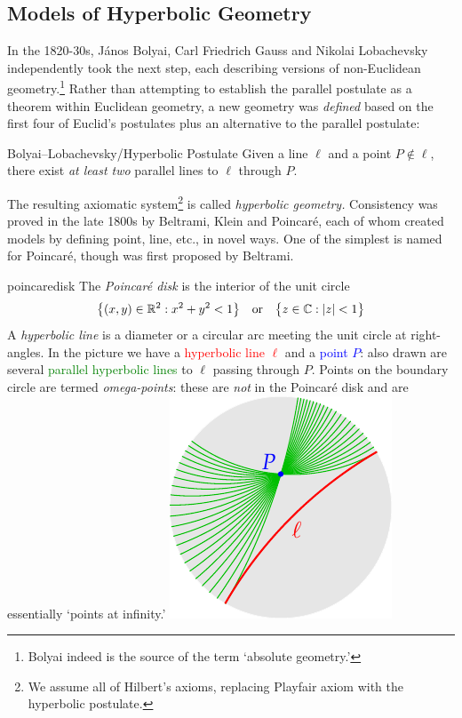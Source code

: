 \clearpage



\subsection{Models of Hyperbolic Geometry}\label{sec:hyp-models}

In the 1820-30s, János Bolyai, Carl Friedrich Gauss and Nikolai Lobachevsky independently took the next step, each describing versions of non-Euclidean geometry.\footnote{Bolyai indeed is the source of the term `absolute geometry.'} Rather than attempting to establish the parallel postulate as a theorem within Euclidean geometry, a new geometry was \emph{defined} based on the first four of Euclid's postulates plus an alternative to the parallel postulate:

\begin{axiom}{Bolyai--Lobachevsky/Hyperbolic Postulate}{}
	Given a line $\ell$ and a point $P\not\in\ell$, there exist \emph{at least two} parallel lines to $\ell$ through $P$.
\end{axiom}

The resulting axiomatic system\footnote{We assume all of Hilbert's axioms, replacing Playfair axiom with the hyperbolic postulate.} is called \emph{hyperbolic geometry.} Consistency was proved in the late 1800s by Beltrami, Klein and Poincaré, each of whom created models by defining point, line, etc., in novel ways. One of the simplest is named for Poincaré, though was first proposed by Beltrami.

\begin{defn}[lower separated=false, sidebyside, sidebyside align=top seam, sidebyside gap=0pt, righthand width=0.3\linewidth]{}{poincaredisk}
	The \emph{Poincaré disk} is the interior of the unit circle
	\[
		\bigl\{(x,y)\in\mathbb{R}^2:x^2+y^2<1\bigr\}
		\quad\text{or}\quad
		\bigl\{z\in\mathbb{C}:\left| z\right|<1\bigr\}
	\]
	A \emph{hyperbolic line} is a diameter or a circular arc meeting the unit circle at right-angles.\smallbreak
	In the picture we have a \textcolor{red}{hyperbolic line $\ell$} and a \textcolor{blue}{point $P$}: also drawn are several \textcolor{Green}{parallel hyperbolic lines} to $\ell$ passing through $P$.\smallbreak
	Points on the boundary circle are termed \emph{omega-points}: these are \emph{not} in the Poincaré disk and are essentially `points at infinity.' 
	\tcblower
	\flushright\includegraphics{models-parallels}
\end{defn}


